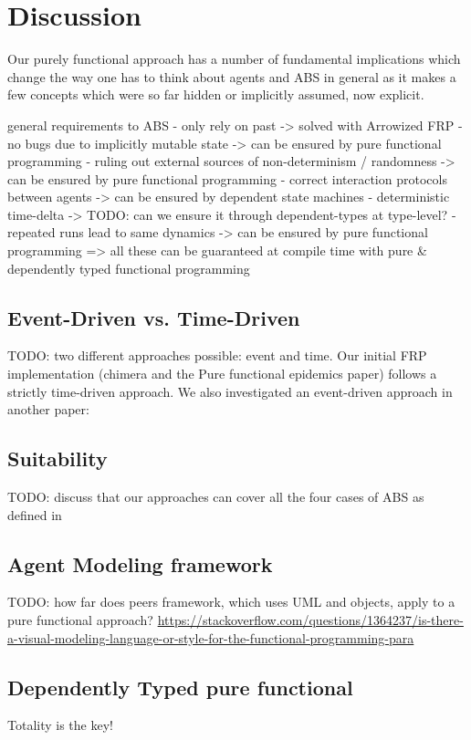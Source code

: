 \section{Discussion}
Our purely functional approach has a number of fundamental implications which change the way one has to think about agents and ABS in general as it makes a few concepts which were so far hidden or implicitly assumed, now explicit. 

general requirements to ABS 
- only rely on past
	-> solved with Arrowized FRP
- no bugs due to implicitly mutable state
	-> can be ensured by pure functional programming
- ruling out external sources of non-determinism / randomness
	-> can be ensured by pure functional programming
- correct interaction protocols between agents
	-> can be ensured by dependent state machines
- deterministic time-delta
	-> TODO: can we ensure it through dependent-types at type-level?
- repeated runs lead to same dynamics 
	-> can be ensured by pure functional programming
=> all these can be guaranteed at compile time with pure \& dependently typed functional programming 


\subsection{Event-Driven vs. Time-Driven}
TODO: two different approaches possible: event and time. Our initial FRP implementation (chimera and the Pure functional epidemics paper) follows a strictly time-driven approach. We also investigated an event-driven approach in another paper: 

\subsection{Suitability}
TODO: discuss that our approaches can cover all the four cases of ABS as defined in \cite{macal_everything_2016}

\subsection{Agent Modeling framework}
TODO: how far does peers framework, which uses UML and objects, apply to a pure functional approach?  \url{https://stackoverflow.com/questions/1364237/is-there-a-visual-modeling-language-or-style-for-the-functional-programming-para}

\subsection{Dependently Typed pure functional}
Totality is the key!

